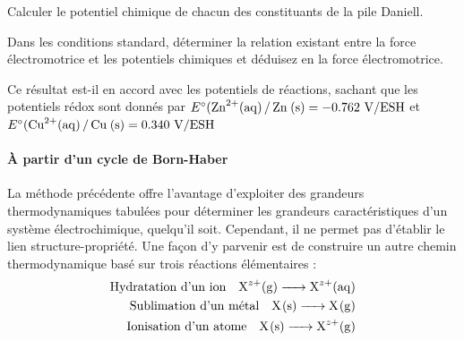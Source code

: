 \Q Calculer le potentiel chimique de chacun des constituants de la pile Daniell.

\Q Dans les conditions standard, déterminer la relation existant entre la force électromotrice et les potentiels chimiques et déduisez en la force électromotrice.

\Q Ce résultat est-il en accord avec les potentiels de réactions, sachant que les potentiels rédox sont donnés par $E^\circ (\ce{Zn^{2+}(aq) / Zn (s)} = -0.762 ~ \si{\volt\per{ESH}}$ et $E^\circ (\ce{Cu^{2+}(aq) / Cu (s)} = 0.340 ~ \si{\volt\per{ESH}}$


\paragraph*{\`{A} partir d'un cycle de Born-Haber}
La méthode précédente offre l'avantage d'exploiter des grandeurs thermodynamiques tabulées pour déterminer les grandeurs caractéristiques d'un système électrochimique, quelqu'il soit. Cependant, il ne permet pas d'établir le lien structure-propriété. Une façon d'y parvenir est de construire un autre chemin thermodynamique basé sur trois réactions élémentaires : 
\begin{align*}
\text{Hydratation d'un ion} \quad \ce{X^{z+}(g) -> X^{z+}(aq)} \\
\text{Sublimation d'un métal} \quad \ce{X(s) -> X(g)} \\
\text{Ionisation d'un atome} \quad \ce{X(s) -> X^{z+}(g)} \\
\end{align*}

